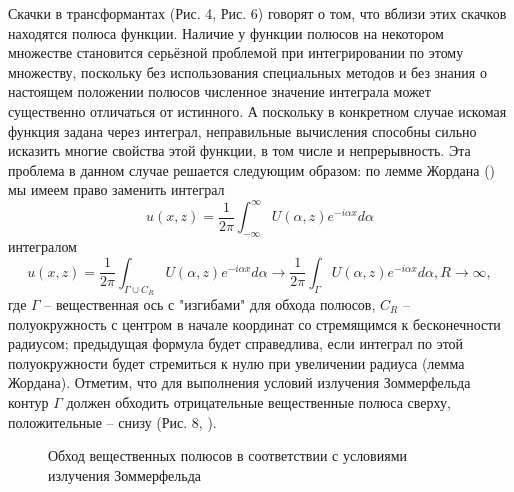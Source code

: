 \documentclass[a4paper, 12pt]{article}
\begin{document}
Скачки в трансформантах (Рис. 4, Рис. 6) говорят о том, что вблизи этих скачков находятся полюса функции. Наличие у функции полюсов на некотором множестве становится серьёзной проблемой при интегрировании по этому множеству, поскольку без использования специальных методов и без знания о настоящем положении полюсов численное значение интеграла может существенно отличаться от истинного. А поскольку в конкретном случае искомая функция задана через интеграл, неправильные вычисления способны сильно исказить многие свойства этой функции, в том числе и непрерывность. Эта проблема в данном случае решается следующим образом: по лемме Жордана (\cite{new,tfkp,korn}) мы имеем право заменить интеграл
$$u(x,z) =\frac{1}{2\pi} \int^{\infty}_{-\infty} U(\alpha, z) e^{-i \alpha x} d\alpha$$
интегралом
$$u(x,z) =\frac{1}{2\pi} \int_{\Gamma\cup C_R} U(\alpha, z) e^{-i \alpha x} d\alpha \rightarrow\frac{1}{2\pi} \int_{\Gamma} U(\alpha, z) e^{-i \alpha x} d\alpha, R\rightarrow \infty,$$
где $\Gamma$ -- вещественная ось с "изгибами" для обхода полюсов, $C_R$ -- полуокружность с центром в начале координат со стремящимся к бесконечности радиусом; предыдущая формула будет справедлива, если интеграл по этой полуокружности будет стремиться к нулю при увеличении радиуса (лемма Жордана). Отметим, что для выполнения условий излучения Зоммерфельда контур $\Gamma$ должен обходить отрицательные вещественные полюса сверху, положительные -- снизу (Рис. 8, \cite{g89,new}).
\begin{figure}[h!]
\noindent{}
\caption{Обход вещественных полюсов в соответствии с условиями излучения Зоммерфельда}
\label{figCurves}
\end{figure} 
\end{document}
